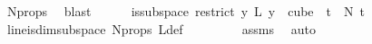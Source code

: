 \begin{isabellebody}
\ N{\isacharprime}{\kern0pt}{\isacharunderscore}{\kern0pt}props\ \isamarkupfalse%
\ blast\isanewline
\isanewline
\ \ \ \ \isamarkupfalse%
\ {\isachardoublequoteopen}is{\isacharunderscore}{\kern0pt}subspace\ {\isacharparenleft}{\kern0pt}restrict\ {\isacharparenleft}{\kern0pt}{\isasymlambda}y{\isachardot}{\kern0pt}\ L\ {\isacharparenleft}{\kern0pt}y\ {}{\isacharparenright}{\kern0pt}{\isacharparenright}{\kern0pt}\ {\isacharparenleft}{\kern0pt}cube\ {}\ t{\isacharparenright}{\kern0pt}{\isacharparenright}{\kern0pt}\ {}\ N{\isacharprime}{\kern0pt}\ t{\isachardoublequoteclose}\ \isamarkupfalse%
\ line{\isacharunderscore}{\kern0pt}is{\isacharunderscore}{\kern0pt}dim{}{\isacharunderscore}{\kern0pt}subspace\ N{\isacharprime}{\kern0pt}{\isacharunderscore}{\kern0pt}props\ L{\isacharunderscore}{\kern0pt}def\ \isanewline
\ \ \ \ \ \ \isamarkupfalse%
\ assms{\isacharparenleft}{\kern0pt}{}{\isacharparenright}{\kern0pt}\ \isamarkupfalse%
\ auto\ \isanewline
\ \ \ \ \isamarkupfalse%
\ \isamarkupfalse%

\end{isabellebody}
